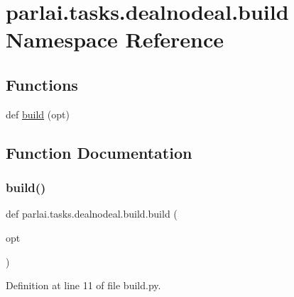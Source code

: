 \hypertarget{namespaceparlai_1_1tasks_1_1dealnodeal_1_1build}{}\section{parlai.\+tasks.\+dealnodeal.\+build Namespace Reference}
\label{namespaceparlai_1_1tasks_1_1dealnodeal_1_1build}
\subsection*{Functions}
\begin{DoxyCompactItemize}
\item 
def \hyperlink{namespaceparlai_1_1tasks_1_1dealnodeal_1_1build_a964c2b43bf49102b9541d584d10d8632}{build} (opt)
\end{DoxyCompactItemize}


\subsection{Function Documentation}
\mbox{\label{namespaceparlai_1_1tasks_1_1dealnodeal_1_1build_a964c2b43bf49102b9541d584d10d8632}} 
\subsubsection{\texorpdfstring{build()}{build()}}
{\footnotesize\ttfamily def parlai.\+tasks.\+dealnodeal.\+build.\+build (\begin{DoxyParamCaption}\item[{}]{opt }\end{DoxyParamCaption})}



Definition at line 11 of file build.\+py.


